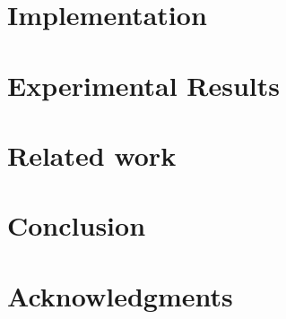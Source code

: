 \documentclass[sigconf]{acmart}
\begin{document}
\section{Implementation}
\label{sec:impl}



\section{Experimental Results}
\label{sec:results}


\section{Related work}
\label{sec:related}


\section{Conclusion}
\label{sec:conclusion}


\section*{Acknowledgments}

%


 
\end{document}
